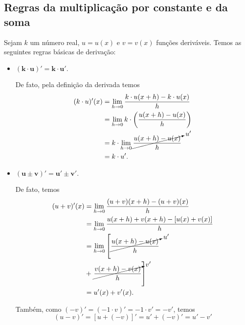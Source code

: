 \cleardoublepage\documentclass[../main.tex]{subfiles}
\begin{document}
\subsection{Regras da multiplicação por constante e da soma}\label{subsec:deriv_rmcs}

Sejam $k$ um número real, $u = u(x)$ e $v = v(x)$ funções deriváveis. Temos as seguintes regras básicas de derivação:
\begin{itemize}
\item $\boldsymbol{(k\cdot u)' = k\cdot u'}$.

  De fato, pela definição da derivada temos
  \begin{align*}
    (k\cdot u)'(x) &= \lim_{h\to 0} \frac{k\cdot u(x+h)-k\cdot u(x)}{h} \\
                   &= \lim_{h\to 0} k\cdot \left(\frac{u(x+h)-u(x)}{h}\right) \\
                   &= k\cdot \lim_{h\to 0} \cancelto{u'}{\frac{u(x+h)-u(x)}{h}} \\
                   &= k\cdot u'.
  \end{align*}
  
 \item $\boldsymbol{(u\pm v)' = u'\pm v'}$.

  De fato, temos
  \begin{align*}
    (u + v)'(x) &= \lim_{h\to 0} \frac{(u + v)(x+h)-(u + v)(x)}{h}\\
                &= \lim_{h\to 0} \frac{u(x+h)+v(x+h)-[u(x)+v(x)]}{h}\\
                &= \lim_{h\to 0} \left[\cancelto{u'}{\frac{u(x+h)-u(x)}{h}} \right. \\
                &+ \left. \cancelto{v'}{\frac{v(x+h)-v(x)}{h}}\right]\\
                &= u'(x) + v'(x).
  \end{align*}

  Também, como $(-v)' = (-1\cdot v)' = -1\cdot v' = -v'$, temos
  \begin{equation}
    (u-v)' = [u+(-v)]' = u' + (-v)' = u' - v'
  \end{equation}
  
\end{itemize}
\end{document}
